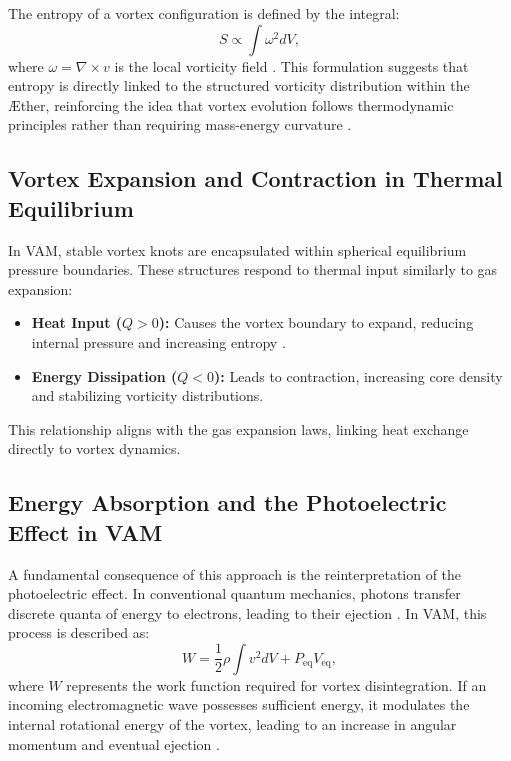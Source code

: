 \documentclass[a4paper,12pt]{article}
\begin{document}
    The entropy of a vortex configuration is defined by the integral:
    \begin{equation}
        S \propto \int \omega^2 dV,
    \end{equation}
    where $\omega = \nabla \times v$ is the local vorticity field \cite{kelvin1867vortex}. This formulation suggests that entropy is directly linked to the structured vorticity distribution within the Æther, reinforcing the idea that vortex evolution follows thermodynamic principles rather than requiring mass-energy curvature \cite{vam2025unified}.

    \subsection{Vortex Expansion and Contraction in Thermal Equilibrium}

    In VAM, stable vortex knots are encapsulated within spherical equilibrium pressure boundaries. These structures respond to thermal input similarly to gas expansion:
    \begin{itemize}
        \item \textbf{Heat Input ($Q > 0$):} Causes the vortex boundary to expand, reducing internal pressure and increasing entropy \cite{clausius1865mechanical}.
        \item \textbf{Energy Dissipation ($Q < 0$):} Leads to contraction, increasing core density and stabilizing vorticity distributions.
    \end{itemize}
    This relationship aligns with the gas expansion laws, linking heat exchange directly to vortex dynamics.

    \subsection{Energy Absorption and the Photoelectric Effect in VAM}

    A fundamental consequence of this approach is the reinterpretation of the photoelectric effect. In conventional quantum mechanics, photons transfer discrete quanta of energy to electrons, leading to their ejection \cite{einstein1905photoelectric}. In VAM, this process is described as:
    \begin{equation}
        W = \frac{1}{2} \rho \int v^2 dV + P_\text{eq} V_\text{eq},
    \end{equation}
    where $W$ represents the work function required for vortex disintegration. If an incoming electromagnetic wave possesses sufficient energy, it modulates the internal rotational energy of the vortex, leading to an increase in angular momentum and eventual ejection \cite{vam2025unified}.
\end{document}
